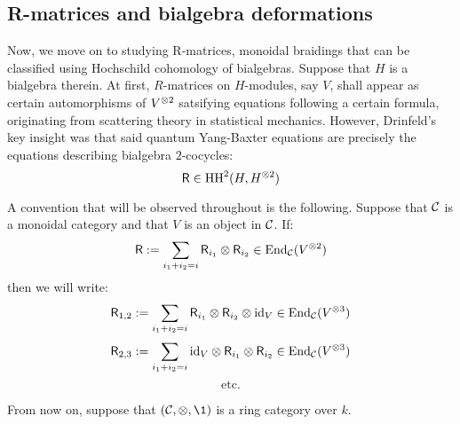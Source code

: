     \subsection{R-matrices and bialgebra deformations}
        Now, we move on to studying R-matrices, monoidal braidings that can be classified using Hochschild cohomology of bialgebras. Suppose that $H$ is a bialgebra therein. At first, $R$-matrices on $H$-modules, say $V$, shall appear as certain automorphisms of $V^{\tensor 2}$ satsifying equations following a certain  formula, originating from scattering theory in statistical mechanics. However, Drinfeld's key insight was that said quantum Yang-Baxter equations are precisely the equations describing bialgebra $2$-cocycles:
            $$\sfR \in \HH^2(H, H^{\tensor 2})$$
    
        \begin{convention}
            A convention that will be observed throughout is the following. Suppose that $\mathcal{C}$ is a monoidal category and that $V$ is an object in $\mathcal{C}$. If:
                $$\sfR := \sum_{i_1 + i_2 = i} \sfR_{i_1} \tensor \sfR_{i_2} \in \End_{\C}(V^{\tensor 2})$$
            then we will write:
                $$\sfR_{1, 2} := \sum_{i_1 + i_2 = i} \sfR_{i_1} \tensor \sfR_{i_2} \tensor \id_V \in \End_{\C}(V^{\tensor 3})$$
                $$\sfR_{2, 3} := \sum_{i_1 + i_2 = i} \id_V \tensor \sfR_{i_1} \tensor \sfR_{i_2} \in \End_{\C}(V^{\tensor 3})$$
                $$\text{etc.}$$
        \end{convention}

        \begin{convention}
            From now on, suppose that $(\C, \tensor, \1)$ is a ring category over $k$.
        \end{convention}
    
